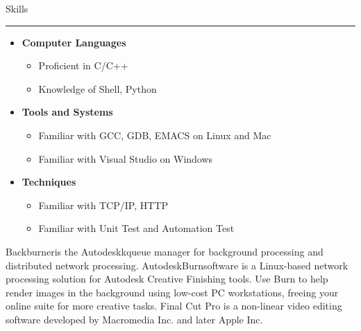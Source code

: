 \documentclass[11pt,oneside]{article}
\def\SymbReg{\textsuperscript{\textregistered}}
\def\SymTM{\textsuperscript{\texttrademark}}
\newenvironment{ressection}[1]{
	\vspace{4pt}
	{\fontfamily{phv}\selectfont\Large#1} \\
	\vspace{-8pt} \rule{\textwidth}{1pt}
	\vspace{1pt}
	\begin{itemize}
}{
	\end{itemize}	
}
\newcommand{\resitem}[1]{
	\vspace{-4pt}
	\item \begin{flushleft} #1 \end{flushleft}
}
\newcommand{\ressubitem}[1]{
	\vspace{-1pt}
	\item \begin{flushleft} \large{#1} \end{flushleft}
}
\newenvironment{reslist}[1]{
	\resitem{\textbf{#1}}
	\vspace{-5pt}
	\begin{itemize}
}{
	\end{itemize}
}
\begin{document}
\begin{ressection}{Skills}

	\begin{reslist}{Computer Languages}

		\ressubitem{Proficient in C/C++}

		\ressubitem{Knowledge of Shell, Python}

	\end{reslist}

	\begin{reslist}{Tools and Systems}

		\ressubitem{Familiar with GCC, GDB, EMACS on Linux and Mac}
		\ressubitem{Familiar with Visual Studio on Windows}

	\end{reslist}
	
	\begin{reslist}{Techniques}
		\ressubitem{Familiar with TCP/IP, HTTP}
		\ressubitem{Familiar with Unit Test and Automation Test}

	\end{reslist}

\end{ressection}


\begin{thebibliography}{9}
Backburner\SymTM is the Autodeskk\SymbReg queue manager for
background processing and distributed network processing. 
Autodesk\SymbReg  Burn\SymbReg  software is a Linux\SymbReg -based network processing solution for Autodesk Creative Finishing tools. Use Burn to help render images in the background using low-cost PC workstations, freeing your online suite for more creative tasks.
Final Cut Pro is a non-linear video editing software developed by Macromedia Inc. and later Apple Inc.
\end{thebibliography}
\end{document}

